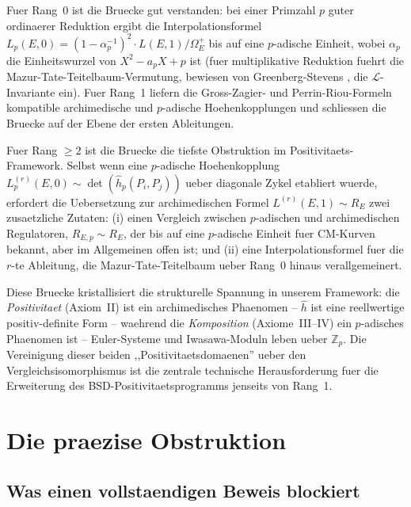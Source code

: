\documentclass[aps,prd,twocolumn,superscriptaddress,nofootinbib]{revtex4-2}
\theoremstyle{definition}
\theoremstyle{remark}
\begin{document}
Fuer Rang~0 ist die Bruecke gut verstanden: bei einer Primzahl $p$ guter ordinaerer Reduktion ergibt die Interpolationsformel $L_p(E,0) = (1 - \alpha_p^{-1})^2 \cdot L(E,1)/\Omega_E^+$ bis auf eine $p$-adische Einheit, wobei $\alpha_p$ die Einheitswurzel von $X^2 - a_p X + p$ ist (fuer multiplikative Reduktion fuehrt die Mazur-Tate-Teitelbaum-Vermutung, bewiesen von Greenberg-Stevens \cite{GreenbergStevens1993}, die $\mathcal{L}$-Invariante ein). Fuer Rang~1 liefern die Gross-Zagier- und Perrin-Riou-Formeln \cite{PerrinRiou1987} kompatible archimedische und $p$-adische Hoehenkopplungen und schliessen die Bruecke auf der Ebene der ersten Ableitungen.

Fuer Rang $\geq 2$ ist die Bruecke die tiefste Obstruktion im Positivitaets-Framework. Selbst wenn eine $p$-adische Hoehenkopplung $L_p^{(r)}(E,0) \sim \det(\hat{h}_p(P_i, P_j))$ ueber diagonale Zykel \cite{DarmonRotger2017} etabliert wuerde, erfordert die Uebersetzung zur archimedischen Formel $L^{(r)}(E,1) \sim R_E$ zwei zusaetzliche Zutaten: (i) einen Vergleich zwischen $p$-adischen und archimedischen Regulatoren, $R_{E,p} \sim R_E$, der bis auf eine $p$-adische Einheit fuer CM-Kurven bekannt, aber im Allgemeinen offen ist; und (ii) eine Interpolationsformel fuer die $r$-te Ableitung, die Mazur-Tate-Teitelbaum ueber Rang~0 hinaus verallgemeinert.

Diese Bruecke kristallisiert die strukturelle Spannung in unserem Framework: die \textit{Positivitaet} (Axiom~II) ist ein archimedisches Phaenomen -- $\hat{h}$ ist eine reellwertige positiv-definite Form -- waehrend die \textit{Komposition} (Axiome~III--IV) ein $p$-adisches Phaenomen ist -- Euler-Systeme und Iwasawa-Moduln leben ueber $\mathbb{Z}_p$. Die Vereinigung dieser beiden ,,Positivitaetsdomaenen'' ueber den Vergleichsisomorphismus ist die zentrale technische Herausforderung fuer die Erweiterung des BSD-Positivitaetsprogramms jenseits von Rang~1.


\section{Die praezise Obstruktion}
\label{sec:obstruction}

\subsection{Was einen vollstaendigen Beweis blockiert}
\end{document}
